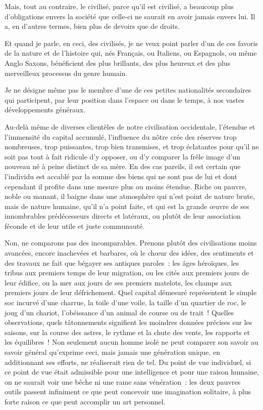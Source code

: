 \documentclass[french,twoside]{book} %
\newcommand{\astermono}{\medskip\centerline{\color{rubric}\large\selectfont{\syms ✻}}\medskip\par}%
\begin{document}
\astermono

\noindent Mais, tout au contraire, le civilisé, parce qu’il est civilisé, a beaucoup plus d’obligations envers la société que celle-ci ne saurait en avoir jamais envers lui. Il a, en d’autres termes, bien plus de devoirs que de droits.\par
Et quand je parle, en ceci, des civilisés, je ne veux point parler d’un de ces favoris de la nature et de l’histoire qui, nés Français, ou Italiens, ou Espagnols, ou même Anglo Saxons, bénéficient des plus brillants, des plus heureux et des plus merveilleux processus du genre humain.\par
Je ne désigne même pas le membre d’une de ces petites nationalités secondaires qui participent, par leur position dans l’espace ou dans le temps, à nos vastes développements généraux.\par
Au-delà même de diverses clientèles de notre civilisation occidentale, l’étendue et l’immensité du capital accumulé, l’influence du nôtre crée des réserves trop nombreuses, trop puissantes, trop bien transmises, et trop éclatantes pour qu’il ne soit pas tout à fait ridicule d’y opposer, ou d’y comparer la frêle image d’un nouveau né à peine distinct de sa mère. En des cas pareils, il est certain que l’individu est accablé par la somme des biens qui ne sont pas de lui et dont cependant il profite dans une mesure plus ou moins étendue. Riche ou pauvre, noble ou manant, il baigne dans une atmosphère qui n’est point de nature brute, mais de nature humaine, qu’il n’a point faite, et qui est la grande œuvre de ses innombrables prédécesseurs directs et latéraux, ou plutôt de leur association féconde et de leur utile et juste communauté.\par
Non, ne comparons pas des incomparables. Prenons plutôt des civilisations moins avancées, encore inachevées et barbares, où le chœur des idées, des sentiments et des travaux ne fait que bégayer ses antiques paroles : les âges héroïques, les tribus aux premiers temps de leur migration, ou les cités aux premiers jours de leur édifice, ou la mer aux jours de ses premiers matelots, les champs aux premiers jours de leur défrichement. Quel capital démesuré représentent le simple soc incurvé d’une charrue, la toile d’une voile, la taille d’un quartier de roc, le joug d’un chariot, l’obéissance d’un animal de course ou de trait ! Quelles observations, quels tâtonnements signifient les moindres données précises sur les saisons, sur la course des astres, le rythme et la chute des vents, les rapports et les équilibres ! Non seulement aucun homme isolé ne peut comparer son savoir au savoir général qu’exprime ceci, mais jamais une génération unique, en additionnant ses efforts, ne réaliserait rien de tel. Du point de vue individuel, si ce point de vue était admissible pour une intelligence et pour une raison humaine, on ne saurait voir une bêche ni une rame sans vénération : les deux pauvres outils passent infiniment ce que peut concevoir une imagination solitaire, à plus forte raison ce que peut accomplir un art personnel.\par
\end{document}
